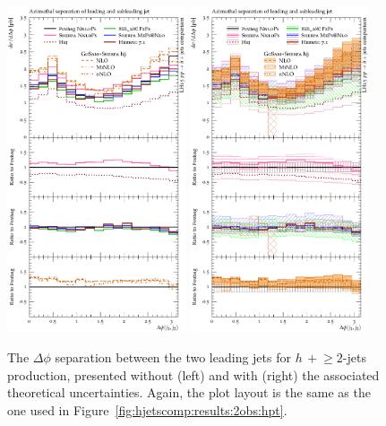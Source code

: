 \begin{figure}[t!]
  \centering
  \includegraphics[width=0.47\textwidth]{figures/hjetscomp_u_deltaphi_jj_incl.pdf}
  \hfill
  \includegraphics[width=0.47\textwidth]{figures/hjetscomp_deltaphi_jj_incl.pdf}
  \caption{\label{fig:hjetscomp:results:2obs:dphijj}%
    The $\Delta\phi$ separation between the two leading jets for
    $h\,+\!\ge\!\!2$-jets production, presented without (left) and with
    (right) the associated theoretical uncertainties. Again, the
    plot layout is the same as the one used in
    Figure~\ref{fig:hjetscomp:results:2obs:hpt}.}
\end{figure}

